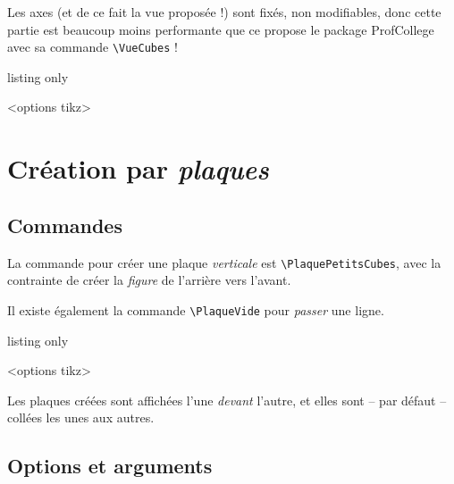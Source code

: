 \documentclass[french,a4paper,11pt]{article}
\begin{document}
\begin{importantblock}
Les axes (et de ce fait la vue proposée !) sont fixés, non modifiables, donc cette partie est beaucoup moins performante que ce propose le package \textsf{ProfCollege} avec sa commande \texttt{\textbackslash VueCubes} !
\end{importantblock}

\begin{PresCodeTex}{listing only}
\begin{EmpilementCubes}[échelle]<options tikz>
\end{EmpilementCubes}
\end{PresCodeTex}

\section{Création par \textit{plaques}}

\subsection{Commandes}

\begin{cautionblock}
La commande pour créer une plaque \textit{verticale} est \texttt{\textbackslash PlaquePetitsCubes}, avec la contrainte de créer la \textit{figure} de l'arrière vers l'avant.

Il existe également la commande \texttt{\textbackslash PlaqueVide} pour \textit{passer} une ligne.
\end{cautionblock}

\begin{PresCodeTex}{listing only}
\begin{EmpilementCubes}[échelle]<options tikz>
	\PlaqueVide[nb]
\end{EmpilementCubes}
\end{PresCodeTex}

\begin{importantblock}
Les plaques créées sont affichées l'une \textit{devant} l'autre, et elles sont -- par défaut -- collées les unes aux autres.
\end{importantblock}

\subsection{Options et arguments}
\end{document}
